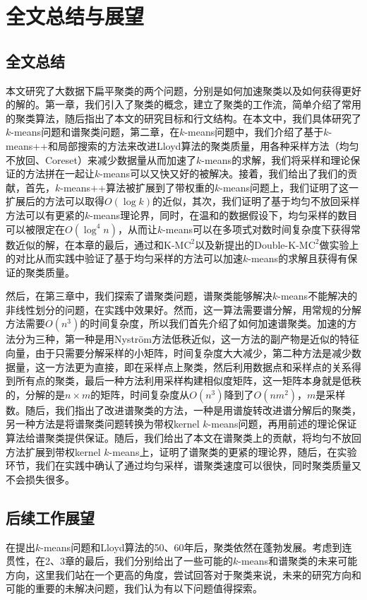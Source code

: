 \chapter{全文总结与展望}

\section{全文总结}
本文研究了大数据下扁平聚类的两个问题，分别是如何加速聚类以及如何获得更好的解的。第一章，我们引入了聚类的概念，建立了聚类的工作流，简单介绍了常用的聚类算法，随后指出了本文的研究目标和行文结构。在本文中，我们具体研究了$k$-means问题和谱聚类问题，第二章，在$k$-means问题中，我们介绍了基于$k$-means++和局部搜索的方法来改进Lloyd算法的聚类质量，用各种采样方法（均匀不放回、Coreset）来减少数据量从而加速了$k$-means的求解，我们将采样和理论保证的方法拼在一起让$k$-means可以又快又好的被解决。接着，我们给出了我们的贡献，首先，$k$-means++算法被扩展到了带权重的$k$-means问题上，我们证明了这一扩展后的方法可以取得$O(\log k)$的近似，其次，我们证明了基于均匀不放回采样方法可以有更紧的$k$-means理论界，同时，在温和的数据假设下，均匀采样的数目可以被限定在$O(\log^4 n)$，从而让$k$-means可以在多项式对数时间复杂度下获得常数近似的解，在本章的最后，通过和K-M$\text{C}^2$以及新提出的Double-K-M$\text{C}^2$做实验上的对比从而实践中验证了基于均匀采样的方法可以加速$k$-means的求解且获得有保证的聚类质量。

然后，在第三章中，我们探索了谱聚类问题，谱聚类能够解决$k$-means不能解决的非线性划分的问题，在实践中效果好。然而，这一算法需要谱分解，用常规的分解方法需要$O(n^3)$的时间复杂度，所以我们首先介绍了如何加速谱聚类。加速的方法分为三种，第一种是用Nyström方法低秩近似，这一方法的副产物是近似的特征向量，由于只需要分解采样的小矩阵，时间复杂度大大减少，第二种方法是减少数据量，这一方法更为直接，即在采样点上聚类，然后利用数据点和采样点的关系得到所有点的聚类，最后一种方法利用采样构建相似度矩阵，这一矩阵本身就是低秩的，分解的是$n\times m$的矩阵，时间复杂度从$O(n^3)$降到了$O(nm^2)$，$m$是采样数。随后，我们指出了改进谱聚类的方法，一种是用谱旋转改进谱分解后的聚类，另一种方法是将谱聚类问题转换为带权kernel $k$-means问题，再用前述的理论保证算法给谱聚类提供保证。随后，我们给出了本文在谱聚类上的贡献，将均匀不放回方法扩展到带权kernel $k$-means上，证明了谱聚类的更紧的理论界，随后，在实验环节，我们在实践中确认了通过均匀采样，谱聚类速度可以很快，同时聚类质量又不会损失很多。

\section{后续工作展望}
在提出$k$-means问题和Lloyd算法的50、60年后，聚类依然在蓬勃发展。考虑到连贯性，在2、3章的最后，我们分别给出了一些可能的$k$-means和谱聚类的未来可能方向，这里我们站在一个更高的角度，尝试回答对于聚类来说，未来的研究方向和可能的重要的未解决问题，我们认为有以下问题值得探索。

